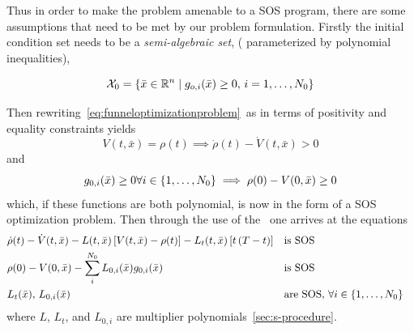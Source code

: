 Thus in order to make the problem amenable to a \ac{SOS} program, there are some
assumptions that need to be met by our problem formulation. Firstly the initial
condition set needs to be a \textit{semi-algebraic set}, (\ie{} parameterized by
polynomial inequalities),

\begin{equation}
  \mathcal{X}_0 = \lbrace\bar{x} \in \mathbb{R}^n \mid g_{o,i}(\bar{x}) \geq 0, \, i = 1,\ldots,N_0\rbrace
\end{equation}

Then rewriting~\cref{eq:funneloptimizationproblem}~as in terms of positivity
and equality constraints yields
\begin{equation}
  V(t,\bar{x}) = \rho(t) \implies \dot{\rho}(t) - \dot{V}(t,\bar{x}) > 0
\end{equation}
and
\begin{equation}
  g_{0,i}(\bar{x}) \geq 0 \forall i \in \lbrace1,\ldots,N_0\rbrace \implies \rho(0) - V(0,\bar{x}) \geq 0
\end{equation}
which, if these functions are both polynomial, is now in the form of a \ac{SOS}
optimization problem. Then through the use of the~ one
arrives at the equations
\begin{align}
  &\dot{\rho}(t) - \dot{V}(t,\bar{x}) - L(t,\bar{x})\left[ V(t,\bar{x}) - \rho(t) \right] - L_{t}(t,\bar{x})\left[ t\left( T - t \right) \right]  && \text{is SOS}& \label{eq:sufficient-conditions}\\
  & \rho(0) - V(0,\bar{x}) - \sum_{i}^{N_{0}} L_{0,i}(\bar{x})g_{0,i}(\bar{x}) && \text{is SOS}& \\
  & L_{t}(\bar{x}), \, L_{0,i}(\bar{x}) \; &&\text{are SOS}, \, \forall i \in \lbrace1,\ldots,N_{0}\rbrace \label{eq:sufficient-conditions3} \\
\end{align} 
where \(L\), \(L_{t}\), and \(L_{0,i}\) are multiplier
polynomials~\cref{sec:s-procedure}.

